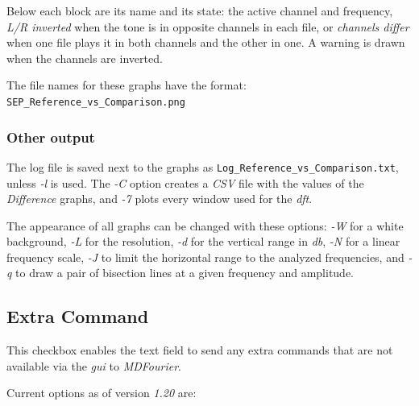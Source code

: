 \documentclass[10pt,a4paper]{report}
\newcommand{\ac}[1]{\textit{\mbox{\acrshort{#1}}}}
\begin{document}
\begin{appendices}
Below each block are its name and its state: the active channel and frequency, \textit{L/R inverted} when the tone is in opposite channels in each file, or \textit{channels differ} when one file plays it in both channels and the other in one. A warning is drawn when the channels are inverted.

The file names for these graphs have the format:\\ \nolinkurl{SEP_Reference_vs_Comparison.png}

\subsubsection{Other output}

The log file is saved next to the graphs as \nolinkurl{Log_Reference_vs_Comparison.txt}, unless \textit{-l} is used. The \textit{-C} option creates a \textit{CSV} file with the values of the \textit{Difference} graphs, and \textit{-7} plots every window used for the \ac{dft}.

The appearance of all graphs can be changed with these options: \textit{-W} for a white background, \textit{-L} for the resolution, \textit{-d} for the vertical range in \ac{db}, \textit{-N} for a linear frequency scale, \textit{-J} to limit the horizontal range to the analyzed frequencies, and \textit{-q} to draw a pair of bisection lines at a given frequency and amplitude.

\subsection{Extra Command}
\label{extracommand}

This checkbox enables the text field to send any extra commands that are not available via the \ac{gui} to \textit{MDFourier}. 

Current options as of version \textit{1.20} are:


\end{appendices}
\end{document}
